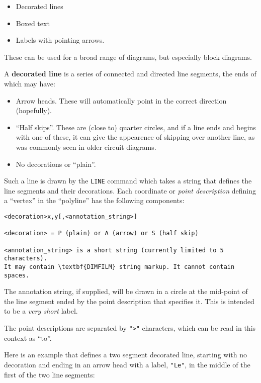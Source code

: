 \documentclass[a4paper,twoside,11pt]{article}
\newcommand{\newpara}{\par\vspace{4mm}\noindent}
\begin{document}
\begin{itemize}
\item
  Decorated lines
\item
  Boxed text
\item
  Labels with pointing arrows.
\end{itemize}

\newpara
These can be used for a broad range of diagrams, but especially block
diagrams.

\newpara
A \textbf{decorated line} is a series of connected and directed line
segments, the ends of which may have:

\begin{itemize}
\item
  Arrow heads. These will automatically point in the correct direction
  (hopefully).
\item
  ``Half skips''. These are (close to) quarter circles, and if a line
  ends and begins with one of these, it can give the appearence of
  skipping over another line, as was commonly seen in older circuit
  diagrams.
\item
  No decorations or ``plain''.
\end{itemize}

\newpara
Such a line is drawn by the \texttt{LINE} command which takes a string
that defines the line segments and their decorations. Each coordinate or
\emph{point description} defining a ``vertex'' in the ``polyline'' has
the following components:

\begin{lstlisting}
<decoration>x,y[,<annotation_string>]

<decoration> = P (plain) or A (arrow) or S (half skip)

<annotation_string> is a short string (currently limited to 5 characters).
It may contain \textbf{DIMFILM} string markup. It cannot contain spaces.
\end{lstlisting}

\newpara
The annotation string, if supplied, will be drawn in a circle at the
mid-point of the line segment ended by the point description that
specifies it. This is intended to be a \emph{very short} label.

\newpara
The point descriptions are separated by \texttt{"\textgreater{}"}
characters, which can be read in this context as ``to''.

\newpara
Here is an example that defines a two segment decorated line, starting
with no decoration and ending in an arrow head with a label,
\texttt{"Le"}, in the middle of the first of the two line segments:
\end{document}

